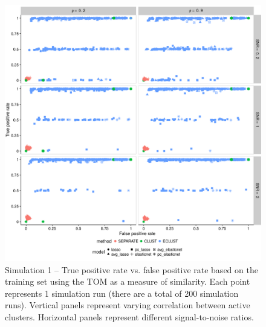 \begin{appendices}
\begin{figure}
	\includegraphics[scale=0.6, keepaspectratio]{./figs/hydra/results/figures/sim1-sept10/tpr_fpr_TOM_sim1.png}
	\caption{Simulation 1 -- True positive rate vs. false positive rate based on the training set using the TOM as a measure of similarity. Each point represents 1 simulation run (there are a total of 200 simulation runs). Vertical panels represent varying correlation between active clusters. Horizontal panels represent different signal-to-noise ratios.}
	\label{fig:tpr_fpr_TOM_sim1}
\end{figure}



\end{appendices}
